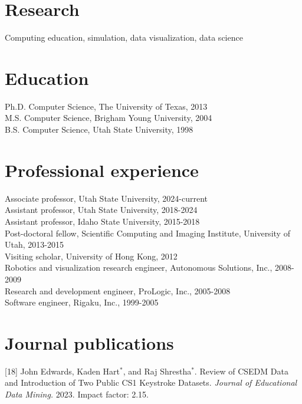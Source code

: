 \documentclass[margin,line]{res}
\newcommand{\jnum}[1]{[#1]}
\begin{document}
\begin{resume}
\section{\sc Research}

Computing education, simulation, data visualization, data science

\section{\sc Education}

Ph.D. Computer Science, The University of Texas, 2013\\
M.S. Computer Science, Brigham Young University, 2004\\
B.S. Computer Science, Utah State University, 1998\\

\section{\sc Professional experience}

Associate professor, Utah State University, 2024-current\\
Assistant professor, Utah State University, 2018-2024\\
Assistant professor, Idaho State University, 2015-2018\\
Post-doctoral fellow, Scientific Computing and Imaging
Institute, University of Utah, 2013-2015\\
Visiting scholar, University of Hong Kong, 2012\\
Robotics and visualization research engineer, Autonomous Solutions, Inc., 2008-2009\\
Research and development engineer, ProLogic, Inc., 2005-2008 \\
Software engineer, Rigaku, Inc., 1999-2005 \\

\section{\sc Journal publications}%
\jnum{18} John Edwards, Kaden Hart$^*$, and Raj Shrestha$^*$. Review of CSEDM Data and Introduction of Two Public CS1 Keystroke Datasets. \textit{Journal of Educational Data Mining.} 2023. Impact factor: 2.15.


\end{resume}
\end{document}
